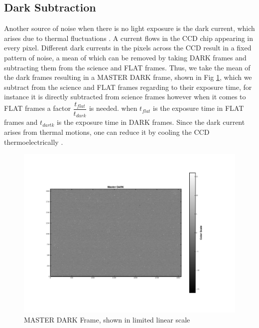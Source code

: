 \documentclass[12pt]{article}
\begin{document}
\subsection{Dark Subtraction}
Another source of noise when there is no light exposure is the dark current, which arises due to thermal fluctuations \cite{lecturenote}. A current flows in the CCD chip appearing in every pixel. Different dark currents in the pixels across the CCD result in a fixed pattern of noise, a mean of which can be removed by taking DARK frames and subtracting them from the science and FLAT frames. Thus, we take the mean of the dark frames resulting in a MASTER DARK frame, shown in Fig \ref{fig2}, which we subtract from the science and FLAT frames regarding to their exposure time, for instance it is directly subtracted from science frames however when it comes to FLAT frames a factor $\dfrac{t_{flat}}{t_{dark}}$ is needed. when $t_{flat}$ is the exposure time in FLAT frames and $t_{dartk}$ is the exposure time in DARK frames. Since the dark current arises from thermal motions, one can reduce it by cooling the CCD thermoelectrically \cite{lecturenote}. 

\begin{figure}[H]
    \centering
    \includegraphics[width=\textwidth]{fig/Master_DARK.png}
    \caption{MASTER DARK Frame, shown in limited linear scale}
      \label{fig2}
    \end{figure}
    
\end{document}
